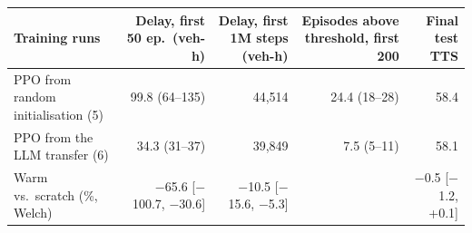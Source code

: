 \begin{tabular}{lrrrr}
\toprule
Training runs & Delay, first 50 ep.\ (veh-h) & Delay, first 1M steps (veh-h) & Episodes above threshold, first 200 & Final test TTS \\
\midrule
PPO from random initialisation (5) & 99.8 (64--135) & 44{,}514 & 24.4 (18--28) & 58.4 \\
PPO from the LLM transfer (6) & 34.3 (31--37) & 39{,}849 & 7.5 (5--11) & 58.1 \\
\midrule
Warm vs.\ scratch (\%, Welch) & $-$65.6 [$-$100.7, $-$30.6] & $-$10.5 [$-$15.6, $-$5.3] & & $-$0.5 [$-$1.2, +0.1] \\
\bottomrule
\end{tabular}
